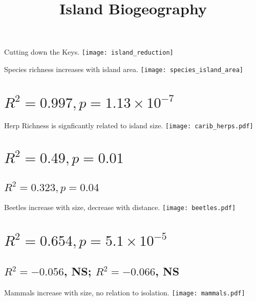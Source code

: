 \documentclass[t]{beamer}
\title{Island Biogeography}
\begin{document}
\begin{frame}{Cutting down the Keys.}
	\centering
		\texttt{[image: island\_reduction]}
\end{frame}

\begin{frame}{Species richness increases with island area.}
	\centering
		\texttt{[image: species\_island\_area]}
\end{frame}

\section{$R^2 = 0.997, p=1.13\times10^{-7}$}

\begin{frame}{Herp Richness is signficantly related to island size.}
	\centering
		\texttt{[image: carib\_herps.pdf]}
\end{frame}

\section{$R^2 = 0.49, p = 0.01$}
\subsection{$R^2 = 0.323, p = 0.04$}

\begin{frame}{Beetles increase with size, decrease with distance.}
	\centering
		\texttt{[image: beetles.pdf]}
\end{frame}

\section{$R^2 = 0.654, p = 5.1\times10^{-5}$}
\subsection{$R^2 = -0.056$, NS; $R^2 = -0.066$, NS}

\begin{frame}{Mammals increase with size, no relation to isolation.}
	\centering
		\texttt{[image: mammals.pdf]}
\end{frame}
\end{document}
